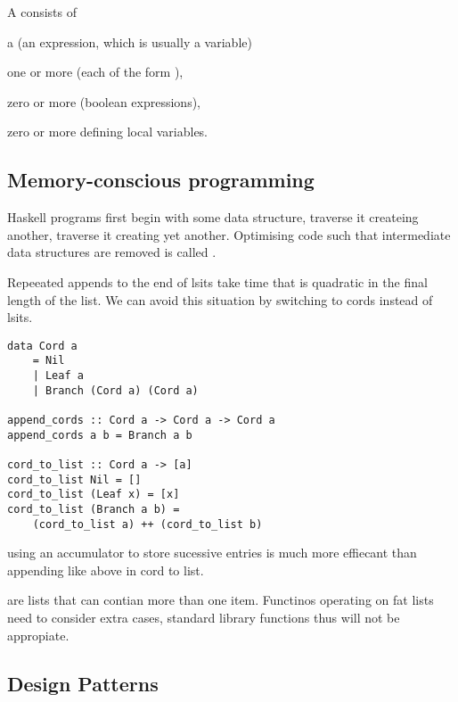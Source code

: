 \begin{compactitem}
\item A  consists of
\begin{compactitem}
\item a  (an expression, which is usually a
variable)
\item one or more  (each of the form ),
\item zero or more  (boolean expressions),
\item zero or more  defining local variables.
\end{compactitem}

\subsection{Memory-conscious programming}
Haskell programs first begin with some data structure, traverse it createing another, traverse it creating yet another. Optimising code such that intermediate data structures are removed is called .

\item Repeeated appends to the end of lsits take time that is quadratic in the final length of the list. We can avoid this situation by switching to cords instead of lsits. 
\begin{lstlisting}
data Cord a
    = Nil
    | Leaf a
    | Branch (Cord a) (Cord a)
    
append_cords :: Cord a -> Cord a -> Cord a
append_cords a b = Branch a b

cord_to_list :: Cord a -> [a]
cord_to_list Nil = []
cord_to_list (Leaf x) = [x]
cord_to_list (Branch a b) =
    (cord_to_list a) ++ (cord_to_list b)
\end{lstlisting}

\item using an accumulator to store sucessive entries is much more effiecant than appending like above in cord to list. 

\item {} are lists that can contian more than one item. Functinos operating on fat lists need to consider extra cases, standard library functions thus will not be appropiate. 

\subsection{Design Patterns}
\item 



\end{compactitem}
